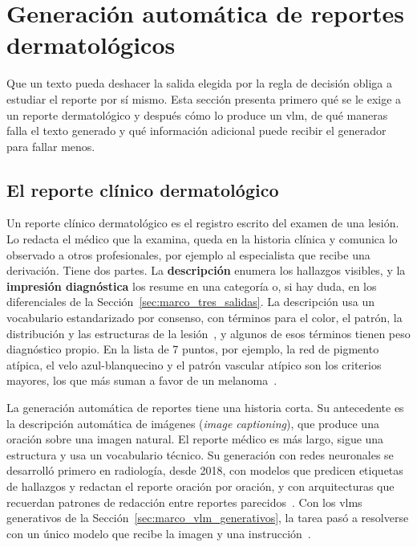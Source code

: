\section{Generación automática de reportes dermatológicos}
\label{sec:marco_reportes}

Que un texto pueda deshacer la salida elegida por la regla de decisión obliga a estudiar el reporte por sí
mismo. Esta sección presenta primero qué se le exige a un reporte dermatológico y después cómo lo produce un
\gls{vlm}, de qué maneras falla el texto generado y qué información adicional puede recibir el generador para
fallar menos.

\subsection{El reporte clínico dermatológico}
\label{sec:marco_rep_tarea}

Un reporte clínico dermatológico es el registro escrito del examen de una lesión. Lo redacta el médico que la
examina, queda en la historia clínica y comunica lo observado a otros profesionales, por ejemplo al
especialista que recibe una derivación. Tiene dos partes. La \textbf{descripción} enumera los hallazgos
visibles, y la \textbf{impresión diagnóstica} los resume en una categoría o, si hay duda, en los diferenciales
de la Sección~\ref{sec:marco_tres_salidas}. La descripción usa un vocabulario estandarizado por consenso, con
términos para el color, el patrón, la distribución y las estructuras de la lesión~\cite{kittler2016standardization},
y algunos de esos términos tienen peso diagnóstico propio. En la lista de 7 puntos, por ejemplo, la red de
pigmento atípica, el velo azul-blanquecino y el patrón vascular atípico son los criterios mayores, los que más
suman a favor de un melanoma~\cite{argenziano1998checklist}.

La generación automática de reportes tiene una historia corta. Su antecedente es la descripción automática de
imágenes (\emph{image captioning}), que produce una oración sobre una imagen natural. El reporte médico es más
largo, sigue una estructura y usa un vocabulario técnico. Su generación con redes neuronales se desarrolló
primero en radiología, desde 2018, con modelos que predicen etiquetas de hallazgos y redactan el reporte
oración por oración, y con arquitecturas que recuerdan patrones de redacción entre reportes
parecidos~\cite{jing2018automatic,chen2020generating}. Con los \glspl{vlm} generativos de la
Sección~\ref{sec:marco_vlm_generativos}, la tarea pasó a resolverse con un único modelo que recibe la imagen y
una instrucción~\cite{hartsock2024vision}.

